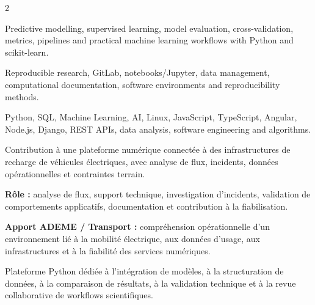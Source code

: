 \documentclass[8pt,a4paper,ragged2e,withhyper]{altacv}
\begin{document}
\begin{paracol}{2}


\small{
Predictive modelling, supervised learning, model evaluation, cross-validation, metrics, pipelines and practical machine learning workflows with Python and scikit-learn.
}

\divider


\small{
Reproducible research, GitLab, notebooks/Jupyter, data management, computational documentation, software environments and reproducibility methods.
}

\divider


\small{
Python, SQL, Machine Learning, AI, Linux, JavaScript, TypeScript, Angular, Node.js, Django, REST APIs, data analysis, software engineering and algorithms.
}

\end{paracol}



Contribution à une plateforme numérique connectée à des infrastructures de recharge de véhicules électriques, avec analyse de flux, incidents, données opérationnelles et contraintes terrain.

\textbf{Rôle :} analyse de flux, support technique, investigation d’incidents, validation de comportements applicatifs, documentation et contribution à la fiabilisation.

\textbf{Apport ADEME / Transport :} compréhension opérationnelle d’un environnement lié à la mobilité électrique, aux données d’usage, aux infrastructures et à la fiabilité des services numériques.

\divider


Plateforme Python dédiée à l’intégration de modèles, à la structuration de données, à la comparaison de résultats, à la validation technique et à la revue collaborative de workflows scientifiques.
\end{document}

